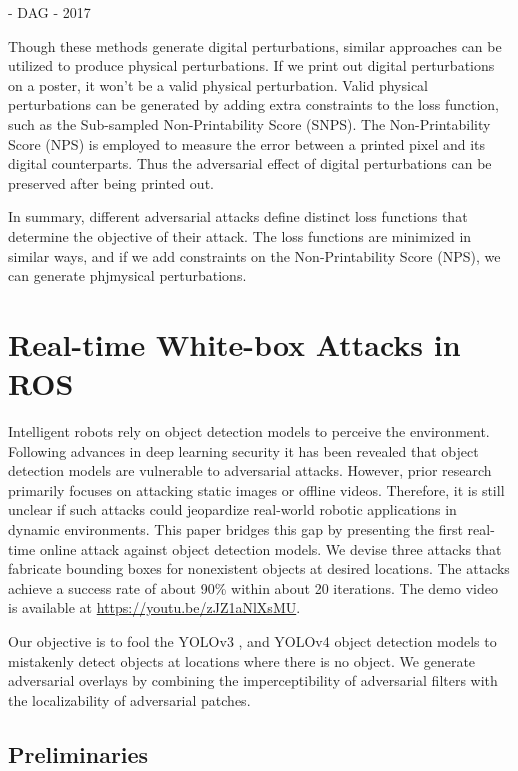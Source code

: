 - DAG \cite{xie2017adversarial} - 2017

Though these methods generate digital perturbations, similar approaches can be utilized to produce physical perturbations. If we print out digital perturbations on a poster, it won't be a valid physical perturbation. Valid physical perturbations can be generated by adding extra constraints to the loss function, such as the Sub-sampled Non-Printability Score (SNPS). The Non-Printability Score (NPS) is employed to measure the error between a printed pixel and its digital counterparts. Thus the adversarial effect of digital perturbations can be preserved after being printed out.

In summary, different adversarial attacks define distinct loss functions that determine the objective of their attack. The loss functions are minimized in similar ways, and if we add constraints on the Non-Printability Score (NPS), we can generate phjmysical perturbations.


\section{Real-time White-box Attacks in ROS}
\label{sec:adv_detect}

Intelligent robots rely on object detection models to perceive the environment. Following advances in deep learning security it has been revealed that object detection models are vulnerable to adversarial attacks. However, prior research primarily focuses on attacking static images or offline videos. Therefore, it is still unclear if such attacks could jeopardize real-world robotic applications in dynamic environments. 
This paper bridges this gap by presenting the first real-time online attack against object detection models. We devise three attacks that fabricate bounding boxes for nonexistent objects at desired locations. The attacks achieve a success rate of about 90\% within about 20 iterations. The demo video is available at \href{https://youtu.be/zJZ1aNlXsMU}{https://youtu.be/zJZ1aNlXsMU}.

Our objective is to fool the YOLOv3 \cite{redmon2018yolov3}, and YOLOv4 \cite{bochkovskiy2020yolov4} object detection models to mistakenly detect objects at locations where there is no object. We generate adversarial overlays by combining the imperceptibility of adversarial filters with the localizability of adversarial patches.

\subsection{Preliminaries}
\label{section_preliminaries}

